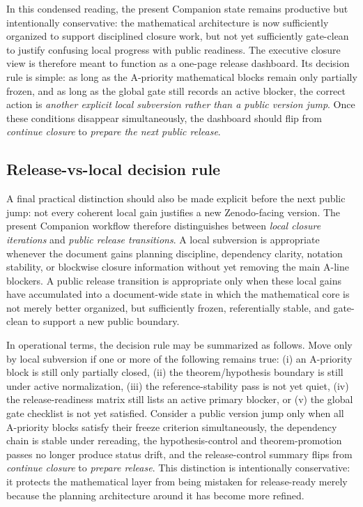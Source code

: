In this condensed reading, the present Companion state remains productive but intentionally conservative: the mathematical architecture is now sufficiently organized to support disciplined closure work, but not yet sufficiently gate-clean to justify confusing local progress with public readiness. The executive closure view is therefore meant to function as a one-page release dashboard. Its decision rule is simple: as long as the A-priority mathematical blocks remain only partially frozen, and as long as the global gate still records an active blocker, the correct action is \emph{another explicit local subversion rather than a public version jump}. Once these conditions disappear simultaneously, the dashboard should flip from \emph{continue closure} to \emph{prepare the next public release}.


\subsection*{Release-vs-local decision rule}
A final practical distinction should also be made explicit before the next public jump: not every coherent local gain justifies a new Zenodo-facing version. The present Companion workflow therefore distinguishes between \emph{local closure iterations} and \emph{public release transitions}. A local subversion is appropriate whenever the document gains planning discipline, dependency clarity, notation stability, or blockwise closure information without yet removing the main A-line blockers. A public release transition is appropriate only when these local gains have accumulated into a document-wide state in which the mathematical core is not merely better organized, but sufficiently frozen, referentially stable, and gate-clean to support a new public boundary.

In operational terms, the decision rule may be summarized as follows. Move only by local subversion if one or more of the following remains true: (i) an A-priority block is still only partially closed, (ii) the theorem/hypothesis boundary is still under active normalization, (iii) the reference-stability pass is not yet quiet, (iv) the release-readiness matrix still lists an active primary blocker, or (v) the global gate checklist is not yet satisfied. Consider a public version jump only when all A-priority blocks satisfy their freeze criterion simultaneously, the dependency chain is stable under rereading, the hypothesis-control and theorem-promotion passes no longer produce status drift, and the release-control summary flips from \emph{continue closure} to \emph{prepare release}. This distinction is intentionally conservative: it protects the mathematical layer from being mistaken for release-ready merely because the planning architecture around it has become more refined.

